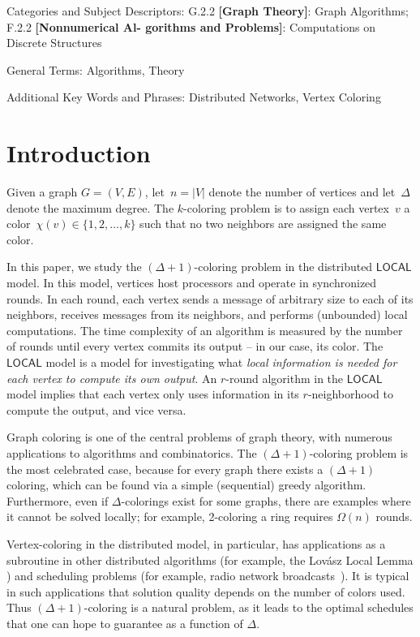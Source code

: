 \documentclass[11pt]{amsart}
\begin{document}
\bigskip

\noindent Categories and Subject Descriptors: G.2.2 \textbf{[Graph Theory]}: Graph Algorithms; F.2.2 \textbf{[Nonnumerical Al-
gorithms and Problems]}: Computations on Discrete Structures

\medskip

\noindent General Terms: Algorithms, Theory

\medskip

\noindent Additional Key Words and Phrases: Distributed Networks, Vertex Coloring


\section{Introduction} \label{sec:Intro}
Given a graph $G = (V,E)$, let~$n = |V|$ denote the number of vertices and let~$\Delta$ denote the maximum degree. The $k$-coloring problem is to assign each vertex~$v$ a color~$\chi(v) \in \{1,2,\ldots, k\}$ such that no two neighbors are assigned the same color.

In this paper, we study the $(\Delta+1)$-coloring problem in the distributed $\mathsf{LOCAL}$ model. In this model, vertices host processors and operate in synchronized rounds. In each round, each vertex sends a message of arbitrary size to each of its neighbors, receives messages from its neighbors, and performs (unbounded) local computations. The time complexity of an algorithm is measured by the number of rounds until every vertex commits its output -- in our case, its color. The $\mathsf{LOCAL}$ model is a model for investigating what {\it local information is needed for each vertex to compute its own output}. An $r$-round algorithm in the $\mathsf{LOCAL}$ model implies that each vertex only uses information in its $r$-neighborhood to compute the output, and vice versa. 

Graph coloring is one of the central problems of graph theory, with numerous applications to algorithms and combinatorics. The  $(\Delta+1)$-coloring problem is the most celebrated case, because for every graph there exists a $(\Delta+1)$ coloring, which can be found via a simple (sequential) greedy algorithm. Furthermore, even if $\Delta$-colorings exist for some graphs, there are examples where it cannot be solved locally; for example, 2-coloring a ring requires $\Omega(n)$ rounds. 

Vertex-coloring in the distributed model, in particular, has applications as a subroutine in other distributed algorithms (for example, the Lov\'{a}sz Local Lemma \cite{fischer2017sublogarithmic}) and scheduling problems (for example, radio network broadcasts~\cite{CK85, CS89, RP89, ET90}). It is typical in such applications that solution quality depends on the number of colors used. Thus $(\Delta+1)$-coloring is a natural problem, as it leads to the optimal schedules that one can hope to guarantee as a function of $\Delta$.
\end{document}

